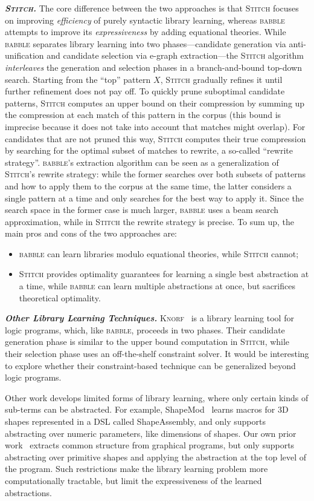 \documentclass[acmsmall,screen,nonacm,review=false,timestamp=false]{acmart}
\newcommand{\emphbf}[1]{\emph{\textbf{#1}\xspace}}
\newcommand{\mypara}[1]{\smallskip\noindent\emphbf{#1.}\xspace}
\newcommand{\tname}[1]{\textsc{#1}\xspace}
\newcommand{\tool}{\tname{babble}}
\newcommand{\stitch}{\tname{Stitch}}
\begin{document}
\mypara{\stitch}
The core difference between the two approaches
is that \stitch focuses on improving \emph{efficiency} of purely syntactic library learning,
whereas \tool attempts to improve its \emph{expressiveness} by adding equational theories.
While \tool separates library learning into two phases---candidate generation via anti-unification and candidate selection via e-graph extraction---the \stitch algorithm \emph{interleaves} the generation and selection phases
in a branch-and-bound top-down search.
Starting from the ``top'' pattern $X$,
\stitch gradually refines it until further refinement does not pay off.
To quickly prune suboptimal candidate patterns,
\stitch computes an upper bound on their compression
by summing up the compression at each match of this pattern in the corpus
(this bound is imprecise because it does not take into account that matches might overlap).
For candidates that are not pruned this way,
\stitch computes their true compression by searching for the optimal subset of matches to rewrite,
a so-called ``rewrite strategy''.
\tool's extraction algorithm can be seen as a generalization of \stitch's rewrite strategy:
while the former searches over both subsets of patterns and how to apply them to the corpus at the same time,
the latter considers a single pattern at a time and only searches for the best way to apply it.
Since the search space in the former case is much larger,
\tool uses a beam search approximation,
while in \stitch the rewrite strategy is precise.
To sum up, the main pros and cons of the two approaches are:
\begin{itemize}
\item \tool can learn libraries modulo equational theories, while \stitch cannot;
\item \stitch provides optimality guarantees for learning a single best abstraction at a time, while \tool can learn multiple abstractions at once, but sacrifices theoretical optimality.
\end{itemize}


\mypara{Other Library Learning Techniques}
\tname{Knorf}~\cite{knorf} is a library learning tool for logic programs,
which, like \tool, proceeds in two phases.
Their candidate generation phase is similar to the upper bound computation in \stitch,
while their selection phase uses an off-the-shelf constraint solver.
It would be interesting to explore whether their constraint-based technique can be generalized beyond logic programs.

Other work develops limited forms of library learning,
where only certain kinds of sub-terms can be abstracted.
For example, ShapeMod~\cite{shapemod} learns macros
  for 3D shapes represented
  in a DSL called ShapeAssembly,
  and only supports abstracting over numeric parameters,
  like dimensions of shapes.
Our own prior work~\cite{cogsci-smiley} extracts common structure from graphical programs,
  but only supports abstracting over primitive shapes
  and applying the abstraction at the top level of the program.
Such restrictions make the library learning problem more computationally tractable,
  but limit the expressiveness of the learned abstractions.
\end{document}
